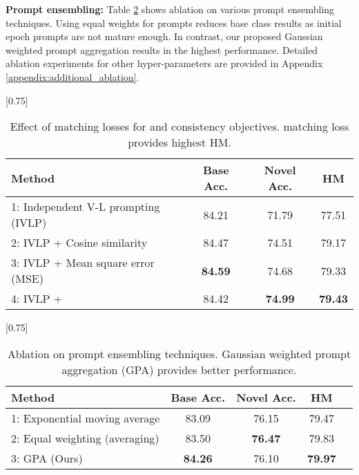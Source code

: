 \documentclass[10pt,twocolumn,letterpaper]{article}
\begin{document}
\noindent \textbf{Prompt ensembling:}
Table \ref{tab:ablations_on_ensembling} shows ablation on various prompt ensembling techniques. Using equal weights for prompts reduces base class results as initial epoch prompts are not mature enough. In contrast, our proposed Gaussian weighted prompt aggregation results in the highest performance. Detailed ablation experiments for other hyper-parameters are provided in Appendix \ref{appendix:additional_ablation}.
\begin{table}[t!]
    \small \centering
 \setlength{\tabcolsep}{7pt}
    \scalebox{0.75}[0.75]{
    \begin{tabular}{lccc}
    \toprule
    Method  & Base Acc. & Novel Acc. & HM \\
    \midrule
    1: Independent V-L prompting (IVLP) & 84.21 & 71.79 & 77.51 \\
    2: IVLP + Cosine similarity & 84.47	&74.51	&79.17 \\
    3: IVLP + Mean square error (MSE)  & \textbf{84.59}&	74.68 &	79.33 \\
     \rowcolor{tabhighlight} 4: IVLP +   & 84.42 & \textbf{74.99} & \textbf{79.43} \\
    \bottomrule
    \end{tabular}}
    \caption{Effect of matching losses for  and  consistency objectives.  matching loss provides highest HM.}
    \label{table:matching_loss_ablations}
\end{table} \begin{table}[t!]
   \small \centering
  \setlength{\tabcolsep}{10pt}
    \scalebox{0.75}[0.75]{
    \begin{tabular}{l cccc}
    \toprule
    Method  & Base Acc. & Novel Acc. & HM\\
            \midrule
    1: Exponential moving average & 83.09	&76.15 &	79.47 \\
    2: Equal weighting (averaging) & 83.50	&\textbf{76.47}	&79.83 \\
    \rowcolor{tabhighlight} 3:  GPA (Ours) & \textbf{84.26} & {76.10} & \textbf{79.97} \\
    \bottomrule
    \end{tabular}
    }\vspace{-0.5em}
    \caption{Ablation on prompt ensembling techniques. Gaussian weighted prompt aggregation (GPA) provides better performance. 
    }
    \label{tab:ablations_on_ensembling}
\end{table} 
\end{document}
